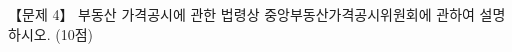 \begin{longquestion}{【문제 4】}
부동산 가격공시에 관한 법령상 중앙부동산가격공시위원회에 관하여 설명하시오. (10점) \par
\end{longquestion}
